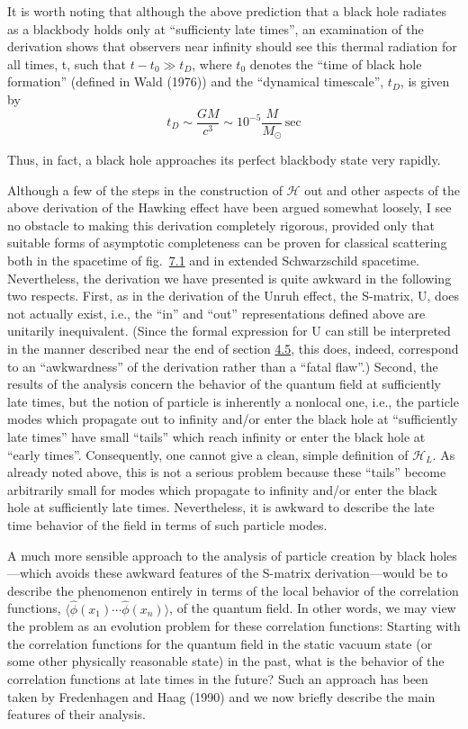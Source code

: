 \documentclass[11pt,a4paper]{article}
\begin{document}
It is worth noting that although the above prediction that a black hole radiates as a blackbody holds only at ``sufficienty late times'', an examination of the derivation shows that observers near infinity should see this thermal radiation for all times, t, such that \(t-t_0 \gg t_D\), where \(t_0\) denotes the ``time of black hole formation'' (defined in Wald (1976)) and the ``dynamical timescale'', \(t_D\), is given by
\begin{equation*}
t_D\sim\frac{GM}{c^3}\sim10^{-5}\frac{M}{M_\odot}\,\mathrm{sec}\tag{7.1.10}\label{eq:7.1.10}
\end{equation*}

Thus, in fact, a black hole approaches its perfect blackbody state very rapidly.

Although a few of the steps in the construction of \(\mathcal{H}\) out and other aspects of the above derivation of the Hawking effect have been argued somewhat loosely, I see no obstacle to making this derivation completely rigorous, provided only that suitable forms of asymptotic completeness can be proven for classical scattering both in the spacetime of fig.~\hyperref[fig:7.1]{7.1} and in extended Schwarzschild spacetime. Nevertheless, the derivation we have presented is quite awkward in the following two respects. First, as in the derivation of the Unruh effect, the S-matrix, U, does not actually exist, i.e., the \hypertarget{source-172}{} ``in'' and ``out'' representations defined above are unitarily inequivalent. (Since the formal expression for U can still be interpreted in the manner described near the end of section \hyperlink{sec:4.5}{4.5}, this does, indeed, correspond to an ``awkwardness'' of the derivation rather than a ``fatal flaw''.) Second, the results of the analysis concern the behavior of the quantum field at sufficiently late times, but the notion of particle is inherently a nonlocal one, i.e., the particle modes which propagate out to infinity and/or enter the black hole at ``sufficiently late times'' have small ``tails'' which reach infinity or enter the black hole at ``early times''. Consequently, one cannot give a clean, simple definition of \(\mathcal{H}_{L}\). As already noted above, this is not a serious problem because these ``tails'' become arbitrarily small for modes which propagate to infinity and/or enter the black hole at sufficiently late times. Nevertheless, it is awkward to describe the late time behavior of the field in terms of such particle modes.

A much more sensible approach to the analysis of particle creation by black holes---which avoids these awkward features of the S-matrix derivation---would be to describe the phenomenon entirely in terms of the local behavior of the correlation functions, \(\langle \hat{\phi}(x_1)\cdots\hat{\phi}(x_n)\rangle \), of the quantum field. In other words, we may view the problem as an evolution problem for these correlation functions: Starting with the correlation functions for the quantum field in the static vacuum state (or some other physically reasonable state) in the past, what is the behavior of the correlation functions at late times in the future? Such an approach has been taken by Fredenhagen and Haag (1990) and we now briefly describe the main features of their analysis.
\end{document}
